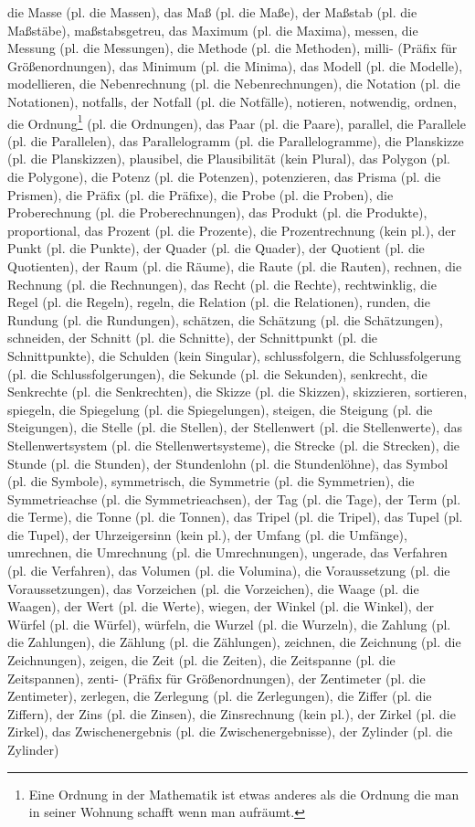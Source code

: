 die Masse (pl. die Massen),
das Maß (pl. die Maße),
der Maßstab (pl. die Maßstäbe),
maßstabsgetreu,
das Maximum (pl. die Maxima),
messen,
die Messung (pl. die Messungen),
die Methode (pl. die Methoden),
milli- (Präfix für Größenordnungen),
das Minimum (pl. die Minima),
das Modell (pl. die Modelle),
modellieren,
die Nebenrechnung (pl. die Nebenrechnungen),
die Notation (pl. die Notationen),
notfalls,
der Notfall (pl. die Notfälle),
notieren,
notwendig,
ordnen,
die Ordnung\footnote{Eine Ordnung in der Mathematik ist etwas anderes als die Ordnung die man in seiner Wohnung schafft wenn man aufräumt.} (pl. die Ordnungen),
das Paar (pl. die Paare),
parallel,
die Parallele (pl. die Parallelen),
das Parallelogramm (pl. die Parallelogramme),
die Planskizze (pl. die Planskizzen),
plausibel,
die Plausibilität (kein Plural),
das Polygon (pl. die Polygone),
die Potenz (pl. die Potenzen),
potenzieren,
das Prisma (pl. die Prismen),
die Präfix (pl. die Präfixe),
die Probe (pl. die Proben),
die Proberechnung (pl. die Proberechnungen),
das Produkt (pl. die Produkte),
proportional,
das Prozent (pl. die Prozente),
die Prozentrechnung (kein pl.),
der Punkt (pl. die Punkte),
der Quader (pl. die Quader),
der Quotient (pl. die Quotienten),
der Raum (pl. die Räume),
die Raute (pl. die Rauten),
rechnen,
die Rechnung (pl. die Rechnungen),
das Recht (pl. die Rechte),
rechtwinklig,
die Regel (pl. die Regeln),
regeln,
die Relation (pl. die Relationen),
runden,
die Rundung (pl. die Rundungen),
schätzen,
die Schätzung (pl. die Schätzungen),
schneiden,
der Schnitt (pl. die Schnitte),
der Schnittpunkt (pl. die Schnittpunkte),
die Schulden (kein Singular),
schlussfolgern,
die Schlussfolgerung (pl. die Schlussfolgerungen),
die Sekunde (pl. die Sekunden),
senkrecht,
die Senkrechte (pl. die Senkrechten),
die Skizze (pl. die Skizzen),
skizzieren,
sortieren,
spiegeln,
die Spiegelung (pl. die Spiegelungen),
steigen,
die Steigung (pl. die Steigungen),
die Stelle (pl. die Stellen),
der Stellenwert (pl. die Stellenwerte),
das Stellenwertsystem (pl. die Stellenwertsysteme),
die Strecke (pl. die Strecken),
die Stunde (pl. die Stunden),
der Stundenlohn (pl. die Stundenlöhne),
das Symbol (pl. die Symbole),
symmetrisch,
die Symmetrie (pl. die Symmetrien),
die Symmetrieachse (pl. die Symmetrieachsen),
der Tag (pl. die Tage),
der Term (pl. die Terme),
die Tonne (pl. die Tonnen),
das Tripel (pl. die Tripel),
das Tupel (pl. die Tupel),
der Uhrzeigersinn (kein pl.),
der Umfang (pl. die Umfänge),
umrechnen,
die Umrechnung (pl. die Umrechnungen),
ungerade,
das Verfahren (pl. die Verfahren),
das Volumen (pl. die Volumina),
die Voraussetzung (pl. die Voraussetzungen),
das Vorzeichen (pl. die Vorzeichen),
die Waage (pl. die Waagen),
der Wert (pl. die Werte),
wiegen,
der Winkel (pl. die Winkel),
der Würfel (pl. die Würfel),
würfeln,
die Wurzel (pl. die Wurzeln),
die Zahlung (pl. die Zahlungen),
die Zählung (pl. die Zählungen),
zeichnen,
die Zeichnung (pl. die Zeichnungen),
zeigen,
die Zeit (pl. die Zeiten),
die Zeitspanne (pl. die Zeitspannen),
zenti- (Präfix für Größenordnungen),
der Zentimeter (pl. die Zentimeter),
zerlegen,
die Zerlegung (pl. die Zerlegungen),
die Ziffer (pl. die Ziffern),
der Zins (pl. die Zinsen),
die Zinsrechnung (kein pl.),
der Zirkel (pl. die Zirkel),
das Zwischenergebnis (pl. die Zwischenergebnisse),
der Zylinder (pl. die Zylinder) 